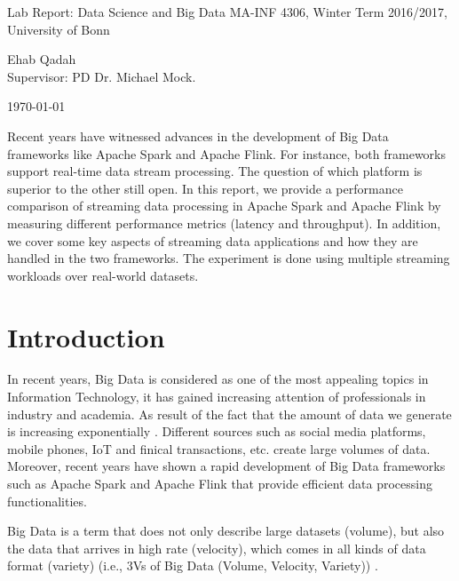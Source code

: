 \documentclass[]{article}
\begin{document}
\begin{flushleft}

\vspace{4pt}

\centering
 Lab Report: Data Science and Big Data MA-INF 4306,
 Winter Term 2016/2017, University of Bonn

\vspace{4pt}
\centering
 Ehab Qadah\\
 Supervisor: PD Dr. Michael Mock.
 \vspace{4pt}
 
 \today
\end{flushleft}


\begin{abstract}

\end{abstract}
Recent years have witnessed advances in the  development of Big Data frameworks like Apache Spark and Apache Flink. For instance, both frameworks support real-time data 
stream processing. The question of which platform is superior to the other still open. 
In this report, we provide a performance comparison of streaming data processing in Apache Spark and Apache Flink by measuring different performance metrics (latency and throughput). In addition, we cover some key aspects of streaming data applications and how they are handled in the two frameworks. The experiment is done using multiple streaming workloads over real-world datasets.
\section{Introduction}

\par In recent years, Big Data is considered as one of the most appealing topics in Information Technology, it has gained increasing attention of professionals in industry and academia. As result of the fact that the amount of data we generate is increasing exponentially \cite{idc}.  Different sources such as  social media platforms, mobile phones, IoT and finical transactions, etc.  create large volumes of data.  Moreover, recent years have shown a rapid development of Big Data frameworks such as Apache Spark and Apache Flink that provide efficient data processing functionalities.
 \par Big Data is a term that does not only describe large datasets (volume), but also the data that arrives in high rate (velocity), which comes in all kinds of data format (variety) (i.e., 3Vs of Big Data (Volume, Velocity, Variety)) \cite{svs}.
\end{document}

